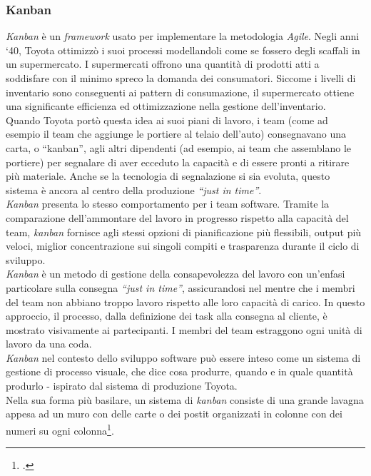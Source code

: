 \subsubsection{Kanban}
\emph{Kanban} è un \emph{framework} usato per implementare la metodologia \emph{Agile}. Negli anni ‘40, Toyota ottimizzò i suoi processi modellandoli come se fossero degli scaffali in un supermercato. I supermercati offrono una quantità di prodotti atti a soddisfare con il minimo spreco la domanda dei consumatori. Siccome i livelli di inventario sono conseguenti ai pattern di consumazione, il supermercato ottiene una significante efficienza ed ottimizzazione nella gestione dell’inventario.\\
Quando Toyota portò questa idea ai suoi piani di lavoro, i team (come ad esempio il team che aggiunge le portiere al telaio dell’auto) consegnavano una carta, o “kanban”, agli altri dipendenti (ad esempio, ai team che assemblano le portiere) per segnalare di aver ecceduto la capacità e di essere pronti a ritirare più materiale. Anche se la tecnologia di segnalazione si sia evoluta, questo sistema è ancora al centro della produzione \emph{“just in time”}.\\
\emph{Kanban} presenta lo stesso comportamento per i team software. Tramite la comparazione dell’ammontare del lavoro in progresso rispetto alla capacità del team, \emph{kanban} fornisce agli stessi opzioni di pianificazione più flessibili, output più veloci, miglior concentrazione sui singoli compiti e trasparenza durante il ciclo di sviluppo.\\
\emph{Kanban} è un metodo di gestione della consapevolezza del lavoro con un’enfasi particolare sulla consegna \emph{“just in time”}, assicurandosi nel mentre che i membri del team non abbiano troppo lavoro rispetto alle loro capacità di carico. In questo approccio, il processo, dalla definizione dei task alla consegna al cliente, è mostrato visivamente ai partecipanti. I membri del team estraggono ogni unità di lavoro da una coda.\\
\emph{Kanban} nel contesto dello sviluppo software può essere inteso come un sistema di gestione di processo visuale, che dice cosa produrre, quando e in quale quantità produrlo - ispirato dal sistema di produzione Toyota.\\
Nella sua forma più basilare, un sistema di \emph{kanban} consiste di una grande lavagna appesa ad un muro con delle carte o dei postit organizzati in colonne con dei numeri su ogni colonna\footcite{site:kanban}.\\

